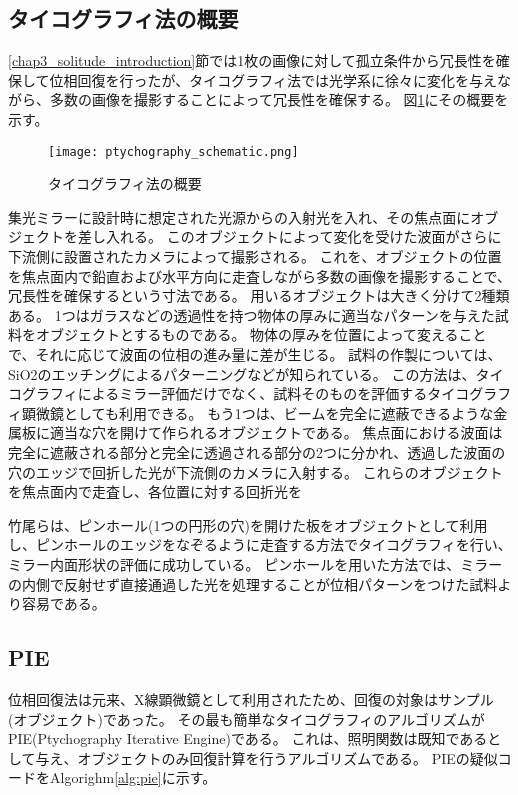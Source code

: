 \subsection{タイコグラフィ法の概要}
\ref{chap3_solitude_introduction}節では1枚の画像に対して孤立条件から冗長性を確保して位相回復を行ったが、タイコグラフィ法では光学系に徐々に変化を与えながら、多数の画像を撮影することによって冗長性を確保する。
図\ref{fig:ptychography_schematic}にその概要を示す。

\begin{figure}[!ht]
\centering
\texttt{[image: ptychography\_schematic.png]}
\caption{タイコグラフィ法の概要}
\label{fig:ptychography_schematic}
\end{figure}

集光ミラーに設計時に想定された光源からの入射光を入れ、その焦点面にオブジェクトを差し入れる。
このオブジェクトによって変化を受けた波面がさらに下流側に設置されたカメラによって撮影される。
これを、オブジェクトの位置を焦点面内で鉛直および水平方向に走査しながら多数の画像を撮影することで、冗長性を確保するという寸法である。
用いるオブジェクトは大きく分けて2種類ある。
1つはガラスなどの透過性を持つ物体の厚みに適当なパターンを与えた試料をオブジェクトとするものである。
物体の厚みを位置によって変えることで、それに応じて波面の位相の進み量に差が生じる。
試料の作製については、SiO2のエッチングによるパターニングなどが知られている。\cite{Godden2016}
この方法は、タイコグラフィによるミラー評価だけでなく、試料そのものを評価するタイコグラフィ顕微鏡としても利用できる。
もう1つは、ビームを完全に遮蔽できるような金属板に適当な穴を開けて作られるオブジェクトである。
焦点面における波面は完全に遮蔽される部分と完全に透過される部分の2つに分かれ、透過した波面の穴のエッジで回折した光が下流側のカメラに入射する。
これらのオブジェクトを焦点面内で走査し、各位置に対する回折光を

竹尾らは、ピンホール(1つの円形の穴)を開けた板をオブジェクトとして利用し、ピンホールのエッジをなぞるように走査する方法でタイコグラフィを行い、ミラー内面形状の評価に成功している。
ピンホールを用いた方法では、ミラーの内側で反射せず直接通過した光を処理することが位相パターンをつけた試料より容易である。

\subsection{PIE}
位相回復法は元来、X線顕微鏡として利用されたため、回復の対象はサンプル(オブジェクト)であった。
その最も簡単なタイコグラフィのアルゴリズムがPIE(Ptychography Iterative Engine)である。
これは、照明関数は既知であるとして与え、オブジェクトのみ回復計算を行うアルゴリズムである。
PIEの疑似コードをAlgorighm\ref{alg:pie}に示す。

